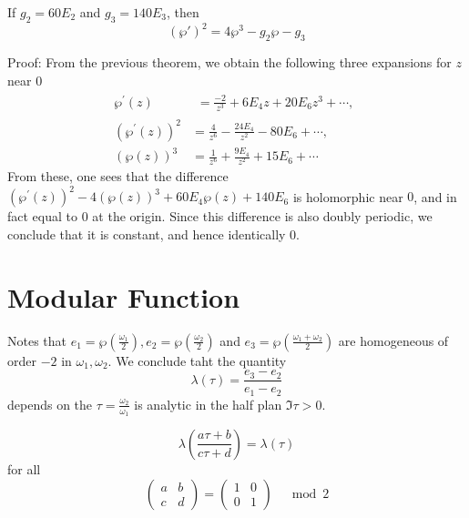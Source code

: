 \documentclass[12pt, oneside]{book}
\begin{document}
\begin{corollary}
    If $g_2 = 60E_2$ and $g_3 = 140E_3$, then
    $$(\wp')^2=4\wp^{3}-g_{2}\wp-g_{3}$$

    Proof: From the previous theorem, we obtain the following three expansions for $z$ near $0$
    $$\begin{aligned}
            \wp^{\prime}(z)     &
            \begin{aligned}
                =\frac{-2}{z^3}+6E_4z+20E_6z^3+\cdots,
            \end{aligned}                                \\
            (\wp^{\prime}(z))^2 & =\frac{4}{z^6}-\frac{24E_4}{z^2}-80E_6+\cdots, \\
            (\wp(z))^3          & =\frac{1}{z^6}+\frac{9E_4}{z^2}+15E_6+\cdots
        \end{aligned}$$
    From these, one sees that the difference $(\wp^{\prime}(z))^2-4(\wp(z))^3+60E_4\wp(z)+140E_6$ is holomorphic near $0$, and in fact equal to $0$ at the origin. Since
    this difference is also doubly periodic, we conclude that it is constant, and hence identically $0$.
\end{corollary}


\section{Modular Function}
\begin{definition}
    Notes that $e_1= \wp \left(\frac{\omega_1}{2}\right),e_2= \wp \left(\frac{\omega_2}{2}\right)$ and $e_3= \wp \left(\frac{\omega_1+\omega_2}{2}\right)$ are homogeneous of order $-2$ in $\omega_1, \omega_2$.
    We conclude taht the quantity
    \begin{equation*}
        \lambda(\tau)
        =
        \frac{e_3 - e_2}{e_1-e_2}
    \end{equation*}
    depends on the $\tau =\frac{\omega_2}{\omega_1}$ is analytic in the half plan $\Im \tau >0$.
\end{definition}

\begin{theorem}
    \begin{equation*}
        \lambda\left(\frac{a \tau +b}{c \tau +d}\right)
        =
        \lambda\left(\tau\right)
    \end{equation*}
    for all
    \begin{equation*}
        \left(\begin{matrix}
            a & b \\
            c & d
        \end{matrix}\right)
        =
        \left(\begin{matrix}
            1 & 0 \\
            0 & 1
        \end{matrix}\right)
        \quad
        \bmod 2
    \end{equation*}
\end{theorem}
\end{document}
